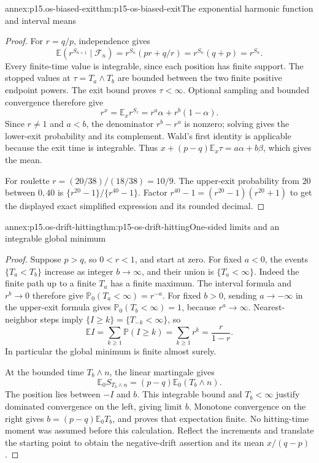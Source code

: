 \begin{annexitem}{annex:p15.os-biased-exit}{thm:p15-os-biased-exit}{The exponential harmonic function and interval means}
\begin{proof}
For \(r=q/p\), independence gives
\[
 \mathbb E(r^{S_{n+1}}\mid\mathcal F_n)
 =r^{S_n}(pr+q/r)=r^{S_n}(q+p)=r^{S_n}.
 \]
Every finite-time value is integrable, since each position has
finite support. The stopped values at \(\tau=T_a\wedge T_b\)
are bounded between the two finite positive endpoint powers.
The exit bound proves \(\tau<\infty\).
Optional sampling and bounded convergence therefore give
\[
 r^x=\mathbb E_xr^{S_\tau}
             =r^a\alpha+r^b(1-\alpha).
 \]
Since \(r\ne1\) and \(a<b\), the denominator \(r^b-r^a\)
is nonzero; solving gives the lower-exit probability and its
complement. Wald's first identity is applicable because the
exit time is integrable. Thus
\(x+(p-q)\mathbb E_x\tau=a\alpha+b\beta\), which gives the mean.

For roulette \(r=(20/38)/(18/38)=10/9\).
The upper-exit probability from \(20\) between \(0,40\) is
\(\{r^{20}-1\}/\{r^{40}-1\}\).
Factor \(r^{40}-1=(r^{20}-1)(r^{20}+1)\) to get the
displayed exact simplified expression and its rounded decimal.
\end{proof}
\end{annexitem}

\begin{annexitem}{annex:p15.os-drift-hitting}{thm:p15-os-drift-hitting}{One-sided limits and an integrable global minimum}
\begin{proof}
Suppose \(p>q\), so \(0<r<1\), and start at zero.
For fixed \(a<0\), the events \(\{T_a<T_b\}\) increase as
integer \(b\to\infty\), and their union is \(\{T_a<\infty\}\).
Indeed the finite path up to a finite \(T_a\) has a finite maximum.
The interval formula and \(r^b\to0\) therefore give
\(\mathbb P_0(T_a<\infty)=r^{-a}\).
For fixed \(b>0\), sending \(a\to-\infty\) in the upper-exit
formula gives \(\mathbb P_0(T_b<\infty)=1\), because
\(r^a\to\infty\).
Nearest-neighbor steps imply
\(\{I\geq k\}=\{T_{-k}<\infty\}\), so
\[
 \mathbb EI=\sum_{k\geq1}\mathbb P(I\geq k)
                =\sum_{k\geq1}r^k=\frac r{1-r}.
 \]
In particular the global minimum is finite almost surely.

At the bounded time \(T_b\wedge n\), the linear martingale gives
\[
 \mathbb E_0S_{T_b\wedge n}
                       =(p-q)\mathbb E_0(T_b\wedge n).
 \]
The position lies between \(-I\) and \(b\).
This integrable bound and \(T_b<\infty\) justify dominated
convergence on the left, giving limit \(b\).
Monotone convergence on the right gives
\(b=(p-q)\mathbb E_0T_b\), and proves that expectation finite.
No hitting-time moment was assumed before this calculation.
Reflect the increments and translate the starting point to obtain
the negative-drift assertion and its mean \(x/(q-p)\).
\end{proof}
\end{annexitem}

